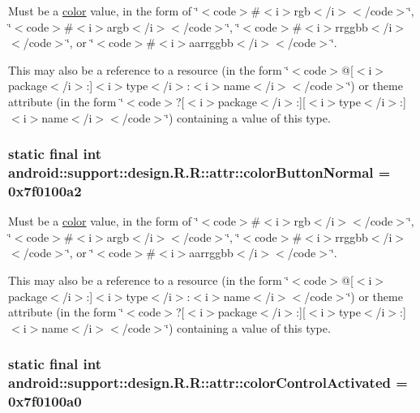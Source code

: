 Must be a \hyperlink{classandroid_1_1support_1_1design_1_1_r_1_1color}{color} value, in the form of \char`\"{}$<$code$>$\#$<$i$>$rgb$<$/i$>$$<$/code$>$\char`\"{}, \char`\"{}$<$code$>$\#$<$i$>$argb$<$/i$>$$<$/code$>$\char`\"{}, \char`\"{}$<$code$>$\#$<$i$>$rrggbb$<$/i$>$$<$/code$>$\char`\"{}, or \char`\"{}$<$code$>$\#$<$i$>$aarrggbb$<$/i$>$$<$/code$>$\char`\"{}. 

This may also be a reference to a resource (in the form \char`\"{}$<$code$>$@\mbox{[}$<$i$>$package$<$/i$>$:\mbox{]}$<$i$>$type$<$/i$>$:$<$i$>$name$<$/i$>$$<$/code$>$\char`\"{}) or theme attribute (in the form \char`\"{}$<$code$>$?\mbox{[}$<$i$>$package$<$/i$>$:\mbox{]}\mbox{[}$<$i$>$type$<$/i$>$:\mbox{]}$<$i$>$name$<$/i$>$$<$/code$>$\char`\"{}) containing a value of this type. \hypertarget{classandroid_1_1support_1_1design_1_1_r_1_1attr_130c59ad81cc23e6ccd7a11161086bf5}{
\subsubsection[{colorButtonNormal}]{\setlength{\rightskip}{0pt plus 5cm}static final int android::support::design.R.R::attr::colorButtonNormal = 0x7f0100a2}}
\label{classandroid_1_1support_1_1design_1_1_r_1_1attr_130c59ad81cc23e6ccd7a11161086bf5}


Must be a \hyperlink{classandroid_1_1support_1_1design_1_1_r_1_1color}{color} value, in the form of \char`\"{}$<$code$>$\#$<$i$>$rgb$<$/i$>$$<$/code$>$\char`\"{}, \char`\"{}$<$code$>$\#$<$i$>$argb$<$/i$>$$<$/code$>$\char`\"{}, \char`\"{}$<$code$>$\#$<$i$>$rrggbb$<$/i$>$$<$/code$>$\char`\"{}, or \char`\"{}$<$code$>$\#$<$i$>$aarrggbb$<$/i$>$$<$/code$>$\char`\"{}. 

This may also be a reference to a resource (in the form \char`\"{}$<$code$>$@\mbox{[}$<$i$>$package$<$/i$>$:\mbox{]}$<$i$>$type$<$/i$>$:$<$i$>$name$<$/i$>$$<$/code$>$\char`\"{}) or theme attribute (in the form \char`\"{}$<$code$>$?\mbox{[}$<$i$>$package$<$/i$>$:\mbox{]}\mbox{[}$<$i$>$type$<$/i$>$:\mbox{]}$<$i$>$name$<$/i$>$$<$/code$>$\char`\"{}) containing a value of this type. \hypertarget{classandroid_1_1support_1_1design_1_1_r_1_1attr_c094705a63cdc8c5b3c090c37629bc8c}{
\subsubsection[{colorControlActivated}]{\setlength{\rightskip}{0pt plus 5cm}static final int android::support::design.R.R::attr::colorControlActivated = 0x7f0100a0}}
\label{classandroid_1_1support_1_1design_1_1_r_1_1attr_c094705a63cdc8c5b3c090c37629bc8c}


